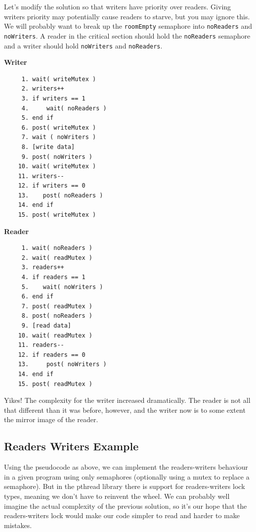 \documentclass[a4paper]{report}
\begin{document}
Let's modify the solution so that writers have priority over readers. Giving writers priority may potentially cause readers to starve, but you may ignore this. We will probably want to break up the \texttt{roomEmpty} semaphore into \texttt{noReaders} and \texttt{noWriters}. A reader in the critical section should hold the \texttt{noReaders} semaphore and a writer should hold \texttt{noWriters} and \texttt{noReaders}.

\begin{multicols}{2}
	\textbf{Writer}\vspace{-1em}
	\begin{verbatim}
     1. wait( writeMutex )
     2. writers++
     3. if writers == 1
     4.     wait( noReaders )
     5. end if
     6. post( writeMutex )
     7. wait ( noWriters )
     8. [write data]
     9. post( noWriters ) 
    10. wait( writeMutex )
    11. writers--
    12. if writers == 0
    13.    post( noReaders )
    14. end if
    15. post( writeMutex )     
  \end{verbatim}
	\columnbreak
	\textbf{Reader}\vspace{-2em}
	\begin{verbatim}
     1. wait( noReaders )
     2. wait( readMutex )
     3. readers++
     4. if readers == 1
     5.    wait( noWriters )
     6. end if
     7. post( readMutex )
     8. post( noReaders )
     9. [read data]
    10. wait( readMutex )
    11. readers--
    12. if readers == 0
    13.     post( noWriters )
    14. end if
    15. post( readMutex )
\end{verbatim}
\end{multicols}
\vspace{-2em}

Yikes! The complexity for the writer increased dramatically. The reader is not all that different than it was before, however, and the writer now is to some extent the mirror image of the reader.

\subsection*{Readers Writers Example}
Using the pseudocode as above, we can implement the readers-writers behaviour in a given program using only semaphores (optionally using a mutex to replace a semaphore). But in the pthread library there is support for readers-writers lock types, meaning we don't have to reinvent the wheel. We can probably well imagine the actual complexity of the previous solution, so it's our hope that the readers-writers lock would make our code simpler to read and harder to make mistakes.
\end{document}
